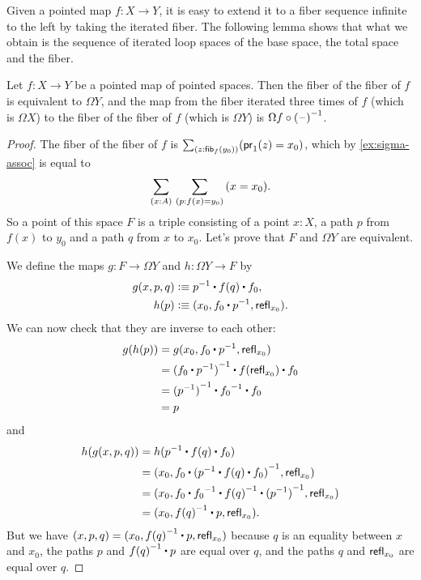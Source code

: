 Given a pointed map $f:X\to Y$, it is easy to extend it to a fiber sequence infinite to
the left by taking the iterated fiber. The following lemma
shows that what we obtain is the sequence of iterated loop spaces of the base
space, the total space and the fiber.
%

\begin{lem}
  Let $f:X\to Y$ be a pointed map of pointed spaces. Then the fiber of the fiber
  of $f$ is equivalent to $\Omega Y$, and the map from the fiber iterated three
  times of $f$ (which is $\Omega X$) to the fiber of the fiber of $f$ (which is
  $\Omega Y$) is $\Omega f\circ\mathord{{(\mathord{\hspace{1pt}\text{--}\hspace{1pt}})}^{-1}}$.
\end{lem}
\begin{proof}
  The fiber of the fiber of $f$ is $\sm{z:\hfib{f}{y_0}} (\proj{1}(z) = x_0)$, which by \autoref{ex:sigma-assoc} is equal to
  \begin{equation*}
    \sm{x:A}{p:f(x)=y_0} (x = x_0).
  \end{equation*}
  So a point of this space $F$ is a triple consisting of a point $x:X$, a path
  $p$ from $f(x)$ to $y_0$ and a path $q$ from $x$ to $x_0$. Let’s prove that
  $F$ and $\Omega Y$ are equivalent.

  We define the maps $g : F \to \Omega Y$ and $h : \Omega Y \to F$ by
  \begin{align*}
    g(x,p,q) &\defeq \rev{p}\ct\ap{f}{q}\ct f_0,\\
    h(p) &\defeq (x_0, f_0\ct\rev{p}, \refl{x_0}).
  \end{align*}
  We can now check that they are inverse to each other:
  \begin{align*}
    g(h(p)) &= g(x_0, f_0\ct\rev{p}, \refl{x_0}) \\
    &= \rev{(f_0\ct\rev{p})}\ct\ap{f}{\refl{x_0}}\ct f_0 \\
    &= \rev{(\rev{p})}\ct\rev{f_0}\ct f_0 \\
    &= p
  \end{align*}
  and
  \begin{align*}
    h(g(x,p,q)) &= h(\rev{p}\ct\ap{f}{q}\ct f_0)\\
    &= (x_0, f_0\ct\rev{(\rev{p}\ct\ap{f}{q}\ct f_0)}, \refl{x_0}) \\
    &= (x_0, f_0\ct\rev{f_0}\ct\rev{\ap{f}{q}}\ct\rev{(\rev{p})}, \refl{x_0}) \\
    &= (x_0, \rev{\ap{f}{q}}\ct p, \refl{x_0}).
  \end{align*}
  But we have $(x,p,q)=(x_0, \rev{\ap{f}{q}}\ct p, \refl{x_0})$ because $q$ is
  an equality between $x$ and $x_0$, the paths $p$ and $\rev{\ap{f}{q}}\ct p$
  are equal over $q$, and the paths $q$ and $\mathsf{refl}_{x_0}$ are equal over $q$.


\end{proof}
